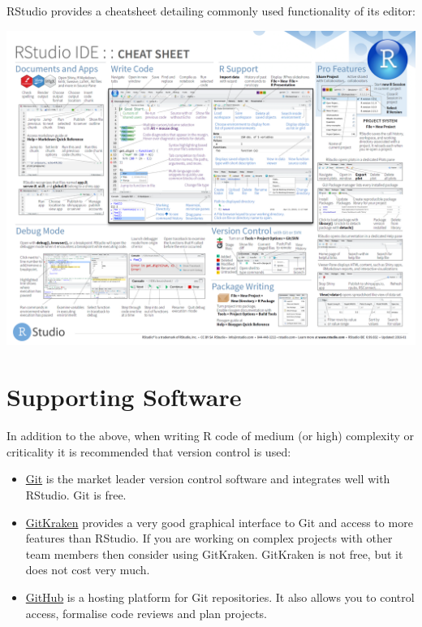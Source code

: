 \documentclass[]{book}
\providecommand{\tightlist}{%
  \setlength{\itemsep}{0pt}\setlength{\parskip}{0pt}}
\begin{document}
RStudio provides a cheatsheet detailing commonly used functionality of its editor:

\href{https://github.com/rstudio/cheatsheets/raw/master/rstudio-ide.pdf}{\includegraphics{images/rstudio-ide.png}}

\hypertarget{supporting-software}{%
\section{Supporting Software}\label{supporting-software}}

In addition to the above, when writing R code of medium (or high) complexity or criticality it is
recommended that version control is used:

\begin{itemize}
\tightlist
\item
  \href{http://gitforwindows.org/}{Git} is the market leader version control software and integrates
  well with RStudio. Git is free.
\item
  \href{https://www.gitkraken.com/}{GitKraken} provides a very good graphical interface to
  Git and access to more features than RStudio. If you are working on complex projects with other
  team members then consider using GitKraken. GitKraken is not free, but it does not cost very
  much.
\item
  \href{https://help.github.com/}{GitHub} is a hosting platform for Git repositories. It also allows
  you to control access, formalise code reviews and plan projects.
\end{itemize}
\end{document}
